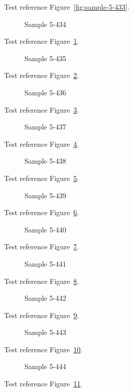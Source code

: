 Test reference Figure~\ref{fig:sample-5-433}.

\begin{figure}[tbhp]
\caption{Sample 5-434}
\label{fig:sample-5-434}
\end{figure}

Test reference Figure~\ref{fig:sample-5-434}.

\begin{figure}[tbhp]
\caption{Sample 5-435}
\label{fig:sample-5-435}
\end{figure}

Test reference Figure~\ref{fig:sample-5-435}.

\begin{figure}[tbhp]
\caption{Sample 5-436}
\label{fig:sample-5-436}
\end{figure}

Test reference Figure~\ref{fig:sample-5-436}.

\begin{figure}[tbhp]
\caption{Sample 5-437}
\label{fig:sample-5-437}
\end{figure}

Test reference Figure~\ref{fig:sample-5-437}.

\begin{figure}[tbhp]
\caption{Sample 5-438}
\label{fig:sample-5-438}
\end{figure}

Test reference Figure~\ref{fig:sample-5-438}.

\begin{figure}[tbhp]
\caption{Sample 5-439}
\label{fig:sample-5-439}
\end{figure}

Test reference Figure~\ref{fig:sample-5-439}.

\begin{figure}[tbhp]
\caption{Sample 5-440}
\label{fig:sample-5-440}
\end{figure}

Test reference Figure~\ref{fig:sample-5-440}.

\begin{figure}[tbhp]
\caption{Sample 5-441}
\label{fig:sample-5-441}
\end{figure}

Test reference Figure~\ref{fig:sample-5-441}.

\begin{figure}[tbhp]
\caption{Sample 5-442}
\label{fig:sample-5-442}
\end{figure}

Test reference Figure~\ref{fig:sample-5-442}.

\begin{figure}[tbhp]
\caption{Sample 5-443}
\label{fig:sample-5-443}
\end{figure}

Test reference Figure~\ref{fig:sample-5-443}.

\begin{figure}[tbhp]
\caption{Sample 5-444}
\label{fig:sample-5-444}
\end{figure}

Test reference Figure~\ref{fig:sample-5-444}.

